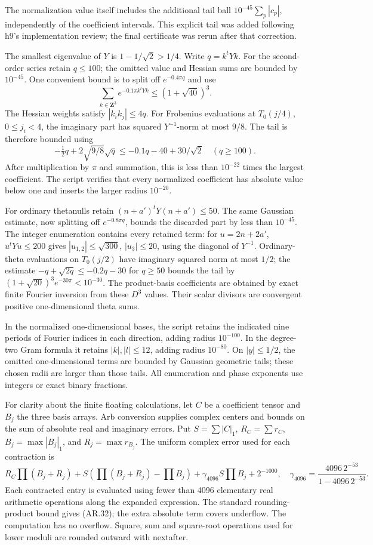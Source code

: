 \documentclass[11pt,a4paper]{article}
\begin{document}
The normalization value itself includes the additional tail ball
\(10^{-45}\sum_p|c_p|\), independently of the coefficient intervals.
This explicit tail was added following h9's implementation review; the
final certificate was rerun after that correction.

The smallest eigenvalue of \(Y\) is \(1-1/\sqrt2>1/4\). Write
\(q=k^tYk\). For the second-order series retain \(q\le100\); the omitted
value and Hessian sums are bounded by \(10^{-45}\). One convenient bound
is to split off \(e^{-0.4\pi q}\) and use \[
\sum_{k\in\mathbf Z^3}e^{-0.1\pi k^tYk}
\le(1+\sqrt{40})^3.
\] The Hessian weights satisfy \(|k_ik_j|\le4q\). For Frobenius
evaluations at \(T_0(j/4)\), \(0\le j_i<4\), the imaginary part has
squared \(Y^{-1}\)-norm at most \(9/8\). The tail is therefore bounded
using \[
-\tfrac12q+2\sqrt{9/8}\sqrt q
\le-0.1q-40+30/\sqrt2\quad(q\ge100).
\] After multiplication by \(\pi\) and summation, this is less than
\(10^{-22}\) times the largest coefficient. The script verifies that
every normalized coefficient has absolute value below one and inserts
the larger radius \(10^{-20}\).

For ordinary thetanulls retain \((n+a')^tY(n+a')\le50\). The same
Gaussian estimate, now splitting off \(e^{-0.8\pi q}\), bounds the
discarded part by less than \(10^{-45}\). The integer enumeration
contains every retained term: for \(u=2n+2a'\), \(u^tYu\le200\) gives
\(|u_{1,2}|\le\sqrt{300}\), \(|u_3|\le20\), using the diagonal of
\(Y^{-1}\). Ordinary-theta evaluations on \(T_0(j/2)\) have imaginary
squared norm at most \(1/2\); the estimate \(-q+\sqrt{2q}\le-0.2q-30\)
for \(q\ge50\) bounds the tail by
\((1+\sqrt{20})^3e^{-30\pi}<10^{-30}\). The product-basis coefficients
are obtained by exact finite Fourier inversion from these \(D^3\)
values. Their scalar divisors are convergent positive one-dimensional
theta sums.

In the normalized one-dimensional bases, the script retains the
indicated nine periods of Fourier indices in each direction, adding
radius \(10^{-100}\). In the degree-two Gram formula it retains
\(|k|,|l|\le12\), adding radius \(10^{-80}\). On \(|y|\le1/2\), the
omitted one-dimensional terms are bounded by Gaussian geometric tails;
these chosen radii are larger than those tails. All enumeration and
phase exponents use integers or exact binary fractions.

For clarity about the finite floating calculations, let \(C\) be a
coefficient tensor and \(B_j\) the three basis arrays. Arb conversion
supplies complex centers and bounds on the sum of absolute real and
imaginary errors. Put \(S=\sum|C|_1\), \(R_C=\sum r_C\),
\(B_j=\max|B_j|_1\), and \(R_j=\max r_{B_j}\). The uniform complex error
used for each contraction is \[
R_C\prod(B_j+R_j)
 +S\left(\prod(B_j+R_j)-\prod B_j\right)
 +\gamma_{4096}S\prod B_j+2^{-1000},
\quad
\gamma_{4096}=\frac{4096\,2^{-53}}{1-4096\,2^{-53}}.
\tag{AR.32}
\] Each contracted entry is evaluated using fewer than 4096 elementary
real arithmetic operations along the expanded expression. The standard
rounding-product bound gives (AR.32); the extra absolute term covers
underflow. The computation has no overflow. Square, sum and square-root
operations used for lower moduli are rounded outward with nextafter.
\end{document}
